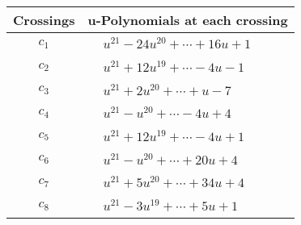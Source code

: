 \documentclass[1p]{elsarticle_modified}
\theoremstyle{definition}
\begin{document}
\begin{tabular}{m{50pt}|m{274pt}}
Crossings & \hspace{64pt}u-Polynomials at each crossing \\
\hline $$\begin{aligned}c_{1}\end{aligned}$$&$\begin{aligned}
&u^{21}-24 u^{20}+\cdots+16 u+1
\end{aligned}$\\
\hline $$\begin{aligned}c_{2}\end{aligned}$$&$\begin{aligned}
&u^{21}+12 u^{19}+\cdots-4 u-1
\end{aligned}$\\
\hline $$\begin{aligned}c_{3}\end{aligned}$$&$\begin{aligned}
&u^{21}+2 u^{20}+\cdots+u-7
\end{aligned}$\\
\hline $$\begin{aligned}c_{4}\end{aligned}$$&$\begin{aligned}
&u^{21}- u^{20}+\cdots-4 u+4
\end{aligned}$\\
\hline $$\begin{aligned}c_{5}\end{aligned}$$&$\begin{aligned}
&u^{21}+12 u^{19}+\cdots-4 u+1
\end{aligned}$\\
\hline $$\begin{aligned}c_{6}\end{aligned}$$&$\begin{aligned}
&u^{21}- u^{20}+\cdots+20 u+4
\end{aligned}$\\
\hline $$\begin{aligned}c_{7}\end{aligned}$$&$\begin{aligned}
&u^{21}+5 u^{20}+\cdots+34 u+4
\end{aligned}$\\
\hline $$\begin{aligned}c_{8}\end{aligned}$$&$\begin{aligned}
&u^{21}-3 u^{19}+\cdots+5 u+1
\end{aligned}$\\

\end{tabular}
\end{document}

